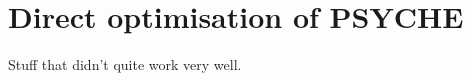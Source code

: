 \section{Direct optimisation of PSYCHE}
\label{sec:pureshift/optimisation}

Stuff that didn't quite work very well.

